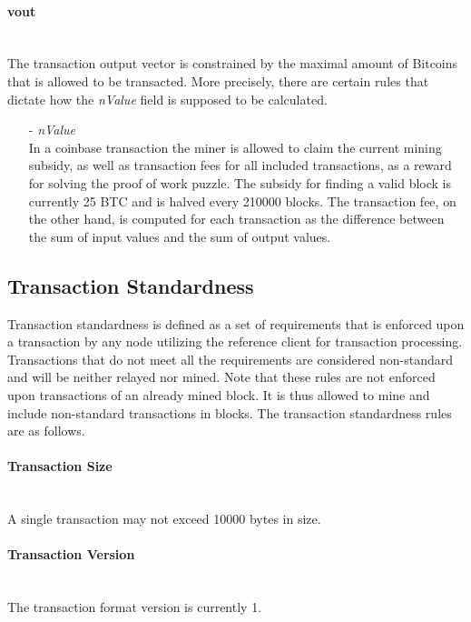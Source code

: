 \paragraph{vout}~\\
The transaction output vector is constrained by the maximal amount of Bitcoins that is allowed to be transacted. More precisely, there are certain rules that dictate how the \textit{nValue} field is supposed to be calculated.

\begin{itemize}
\item[-] \textit{nValue}~\\
In a coinbase transaction the miner is allowed to claim the current mining subsidy, as well as transaction fees for all included transactions, as a reward for solving the proof of work puzzle. The subsidy for finding a valid block is currently 25 BTC and is halved every 210000 blocks. The transaction fee, on the other hand, is computed for each transaction as the difference between the sum of input values and the sum of output values.
\end{itemize}


\clearpage
\subsection{Transaction Standardness} \label{sec:TransactionStandardness}
Transaction standardness is defined as a set of requirements that is enforced upon a transaction by any node utilizing the reference client for transaction processing. Transactions that do not meet all the requirements are considered non-standard and will be neither relayed nor mined. Note that these rules are not enforced upon transactions of an already mined block. It is thus allowed to mine and include non-standard transactions in blocks. The transaction standardness rules are as follows.

\paragraph{Transaction Size}~\\
A single transaction may not exceed 10000 bytes in size.

\paragraph{Transaction Version}~\\
The transaction format version is currently 1.

